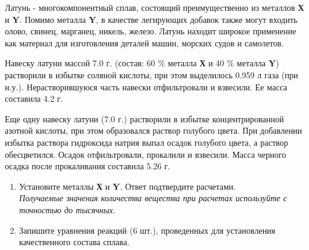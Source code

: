 
Латунь - многокомпонентный сплав, состоящий преимущественно из металлов \textbf{Х} и \textbf{Y}. Помимо металла \textbf{Y}, в качестве легирующих добавок также могут входить олово, свинец, марганец, никель, железо. Латунь находит широкое применение как материал для изготовления деталей машин, морских судов и самолетов.

Навеску латуни массой 7.0 г. (состав: 60 \% металла \textbf{Х} и 40 \% металла \textbf{Y}) растворили в избытке соляной кислоты, при этом выделилось 0.959 л газа (при н.у.). Нерастворившуюся часть навески отфильтровали и взвесили. Ее масса составила 4.2 г.

Еще одну навеску латуни (7.0 г.) растворили в избытке концентрированной азотной кислоты, при этом образовался раствор голубого цвета. При добавлении избытка раствора гидроксида натрия выпал осадок голубого цвета, а раствор обесцветился. Осадок отфильтровали, прокалили и взвесили. Масса черного осадка после прокаливания составила 5.26 г.

\begin{enumerate}
\item Установите металлы \textbf{Х} и \textbf{Y}. Ответ подтвердите расчетами.\\
\textit{Получаемые значения количества вещества при расчетах используйте с точностью до тысячных.}
\item Запишите уравнения реакций (6 шт.), проведенных для установления качественного состава сплава.
\end{enumerate}